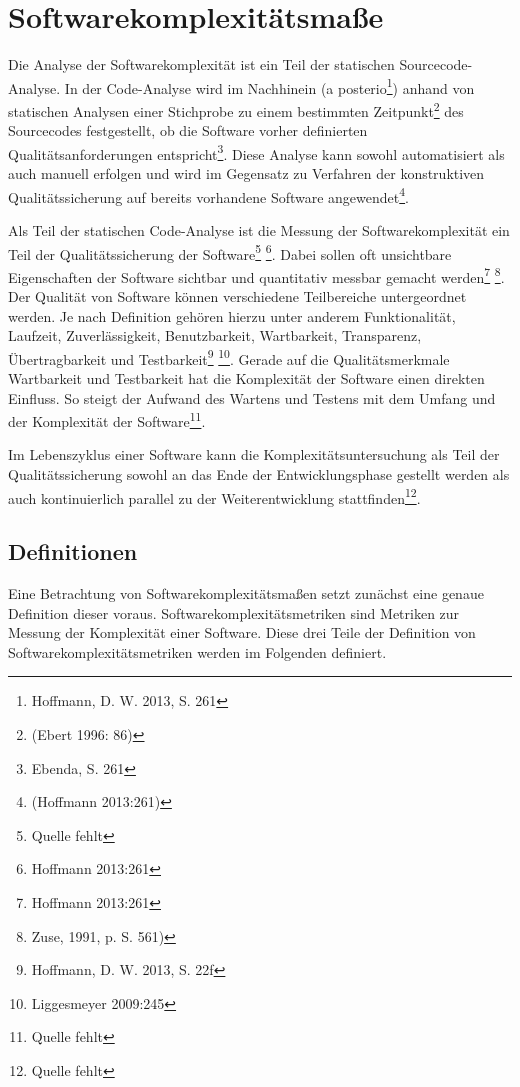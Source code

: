 \chapter{Softwarekomplexitätsmaße}\label{softwarekomplexituxe4tsmauxdfe}

Die Analyse der Softwarekomplexität ist ein Teil der statischen
Sourcecode-Analyse. In der Code-Analyse wird im Nachhinein (a
posterio\footnote{Hoffmann, D. W. 2013, S. 261}) anhand von statischen
Analysen einer Stichprobe zu einem bestimmten Zeitpunkt\footnote{(Ebert
  1996: 86)} des Sourcecodes festgestellt, ob die Software vorher
definierten Qualitätsanforderungen entspricht\footnote{Ebenda, S. 261}.
Diese Analyse kann sowohl automatisiert als auch manuell erfolgen und
wird im Gegensatz zu Verfahren der konstruktiven Qualitätssicherung auf
bereits vorhandene Software angewendet\footnote{(Hoffmann 2013:261)}.

Als Teil der statischen Code-Analyse ist die Messung der
Softwarekomplexität ein Teil der Qualitätssicherung der
Software\footnote{Quelle fehlt} \footnote{Hoffmann 2013:261}. Dabei
sollen oft unsichtbare Eigenschaften der Software sichtbar und
quantitativ messbar gemacht werden\footnote{Hoffmann 2013:261}
\footnote{Zuse, 1991, p. S. 561)}. Der Qualität von Software können
verschiedene Teilbereiche untergeordnet werden. Je nach Definition
gehören hierzu unter anderem Funktionalität, Laufzeit, Zuverlässigkeit,
Benutzbarkeit, Wartbarkeit, Transparenz, Übertragbarkeit und
Testbarkeit\footnote{Hoffmann, D. W. 2013, S. 22f} \footnote{Liggesmeyer
  2009:245}. Gerade auf die Qualitätsmerkmale Wartbarkeit und
Testbarkeit hat die Komplexität der Software einen direkten Einfluss. So
steigt der Aufwand des Wartens und Testens mit dem Umfang und der
Komplexität der Software\footnote{Quelle fehlt}.

Im Lebenszyklus einer Software kann die Komplexitätsuntersuchung als
Teil der Qualitätssicherung sowohl an das Ende der Entwicklungsphase
gestellt werden als auch kontinuierlich parallel zu der
Weiterentwicklung stattfinden\footnote{Quelle fehlt}.

\section{Definitionen}\label{definitionen}

Eine Betrachtung von Softwarekomplexitätsmaßen setzt zunächst eine
genaue Definition dieser voraus. Softwarekomplexitätsmetriken sind
Metriken zur Messung der Komplexität einer Software. Diese drei Teile
der Definition von Softwarekomplexitätsmetriken werden im Folgenden
definiert.

